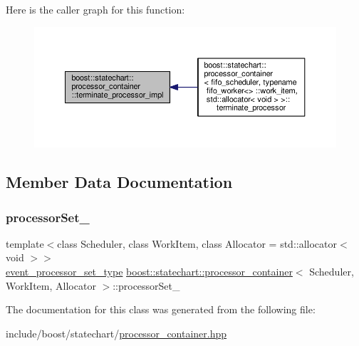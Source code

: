 Here is the caller graph for this function\+:
\nopagebreak
\begin{figure}[H]
\begin{center}
\leavevmode
\includegraphics[width=350pt]{classboost_1_1statechart_1_1processor__container_a883cf537f7ae021aa79c8614f993f442_icgraph}
\end{center}
\end{figure}


\subsection{Member Data Documentation}
\mbox{\label{classboost_1_1statechart_1_1processor__container_a5d971d1e7d4745e2c5ffd421aa13291a}} 
\subsubsection{\texorpdfstring{processor\+Set\+\_\+}{processorSet\_}}
{\footnotesize\ttfamily template$<$class Scheduler, class Work\+Item, class Allocator = std\+::allocator$<$ void $>$$>$ \\
\mbox{\hyperlink{classboost_1_1statechart_1_1processor__container_a34f8c87b6b4f8a8620c0bc6b124d0c77}{event\+\_\+processor\+\_\+set\+\_\+type}} \mbox{\hyperlink{classboost_1_1statechart_1_1processor__container}{boost\+::statechart\+::processor\+\_\+container}}$<$ Scheduler, Work\+Item, Allocator $>$\+::processor\+Set\+\_\+\hspace{0.3cm}{\ttfamily [private]}}



The documentation for this class was generated from the following file\+:\begin{DoxyCompactItemize}
\item 
include/boost/statechart/\mbox{\hyperlink{processor__container_8hpp}{processor\+\_\+container.\+hpp}}\end{DoxyCompactItemize}
